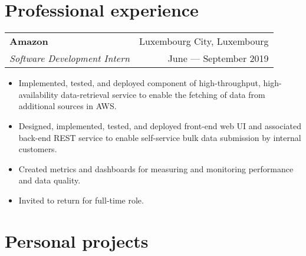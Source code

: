 \documentclass[11pt,a4paper]{article}
\begin{document}
\section*{Professional experience}
\begin{tabularx}{\textwidth}{X r}
    \textbf{Amazon} & Luxembourg City, Luxembourg \\
    \emph{Software Development Intern} & June --- September 2019 \\
\end{tabularx}
\begin{itemize}
    \item Implemented, tested, and deployed component of high-throughput,
        high-availability data-retrieval service to enable the fetching of
        data from additional sources in AWS.\@
    \item Designed, implemented, tested, and deployed front-end web UI and associated back-end REST service to
        enable self-service bulk data submission by internal customers.
    \item Created metrics and dashboards for measuring and monitoring performance and data quality.
    \item Invited to return for full-time role.
\end{itemize}


\midrule

\section*{Personal projects}


\end{document}
